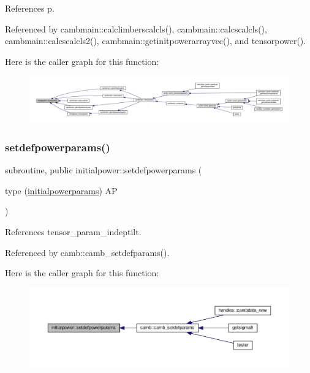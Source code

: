 References p.



Referenced by cambmain\+::calclimberscalcls(), cambmain\+::calcscalcls(), cambmain\+::calcscalcls2(), cambmain\+::getinitpowerarrayvec(), and tensorpower().

Here is the caller graph for this function\+:
\nopagebreak
\begin{figure}[H]
\begin{center}
\leavevmode
\includegraphics[width=350pt]{namespaceinitialpower_a2263ec918226f30880a9efbedf684be8_icgraph}
\end{center}
\end{figure}
\mbox{\label{namespaceinitialpower_a0af6f4d15e7cc386f038c557a83256e1}} 
\subsubsection{\texorpdfstring{setdefpowerparams()}{setdefpowerparams()}}
{\footnotesize\ttfamily subroutine, public initialpower\+::setdefpowerparams (\begin{DoxyParamCaption}\item[{type (\mbox{\hyperlink{structinitialpower_1_1initialpowerparams}{initialpowerparams}})}]{AP }\end{DoxyParamCaption})}



References tensor\+\_\+param\+\_\+indeptilt.



Referenced by camb\+::camb\+\_\+setdefparams().

Here is the caller graph for this function\+:
\nopagebreak
\begin{figure}[H]
\begin{center}
\leavevmode
\includegraphics[width=350pt]{namespaceinitialpower_a0af6f4d15e7cc386f038c557a83256e1_icgraph}
\end{center}
\end{figure}
\mbox{\label{namespaceinitialpower_aa1fdc1f3bcc69e61d7f690fa3ffd7f02}} 
